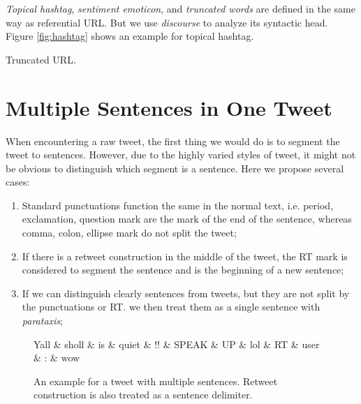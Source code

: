 \documentclass[11pt,a4paper]{article}
\begin{document}
\textit{Topical hashtag}, \textit{sentiment emoticon}, and \textit{truncated words}
are defined in the same way as referential URL.
But we use \textit{discourse} to analyze its syntactic head.
Figure \ref{fig:hashtag} shows an example for topical hashtag.

Truncated URL.

\section{Multiple Sentences in One Tweet}\label{sec:sent-seg}
When encountering a raw tweet, 
the first thing we would do is to segment the tweet to sentences.
However, due to the highly varied styles of tweet, 
it might not be obvious to distinguish which segment is a sentence.
Here we propose several cases:
\begin{enumerate}
	\item Standard punctuations function the same in the normal text,
	i.e. period, exclamation, question mark are the mark of the end of the sentence,
	whereas comma, colon, ellipse mark do not split the tweet;
	\item If there is a retweet construction in the middle of the tweet,
	the RT mark is considered to segment the sentence and is the beginning of a new sentence;
	\item If we can distinguish clearly sentences from tweets, 
	but they are not split by the punctuations or RT. 
	we then treat them as a single sentence with \textit{parataxis};
\end{enumerate}

\begin{figure}[t]
	\centering
	\small
	\begin{dependency}[edge slant=2, text only label, label style=above]
		\begin{deptext}
			Yall \& sholl \& is \& quiet \& !! \& SPEAK \& UP \& lol \& RT \& user \& : \& wow \\
		\end{deptext}
	\end{dependency}
	\caption{An example for a tweet with multiple sentences. 
		Retweet  construction is also treated as a sentence delimiter.}\label{fig:multi-seg}
\end{figure}
\end{document}
